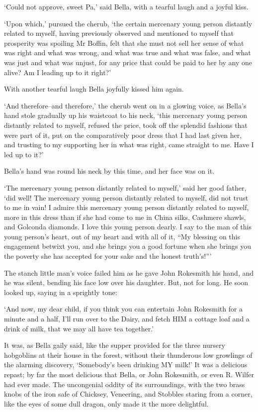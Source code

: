‘Could not approve, sweet Pa,’ said Bella, with a tearful laugh and a
joyful kiss.

‘Upon which,’ pursued the cherub, ‘the certain mercenary young person
distantly related to myself, having previously observed and mentioned
to myself that prosperity was spoiling Mr Boffin, felt that she must not
sell her sense of what was right and what was wrong, and what was true
and what was false, and what was just and what was unjust, for any
price that could be paid to her by any one alive? Am I leading up to it
right?’

With another tearful laugh Bella joyfully kissed him again.

‘And therefore--and therefore,’ the cherub went on in a glowing voice,
as Bella’s hand stole gradually up his waistcoat to his neck, ‘this
mercenary young person distantly related to myself, refused the
price, took off the splendid fashions that were part of it, put on the
comparatively poor dress that I had last given her, and trusting to my
supporting her in what was right, came straight to me. Have I led up to
it?’

Bella’s hand was round his neck by this time, and her face was on it.

‘The mercenary young person distantly related to myself,’ said her
good father, ‘did well! The mercenary young person distantly related
to myself, did not trust to me in vain! I admire this mercenary young
person distantly related to myself, more in this dress than if she had
come to me in China silks, Cashmere shawls, and Golconda diamonds. I
love this young person dearly. I say to the man of this young person’s
heart, out of my heart and with all of it, “My blessing on this
engagement betwixt you, and she brings you a good fortune when she
brings you the poverty she has accepted for your sake and the honest
truth’s!”’

The stanch little man’s voice failed him as he gave John Rokesmith his
hand, and he was silent, bending his face low over his daughter. But,
not for long. He soon looked up, saying in a sprightly tone:

‘And now, my dear child, if you think you can entertain John Rokesmith
for a minute and a half, I’ll run over to the Dairy, and fetch HIM a
cottage loaf and a drink of milk, that we may all have tea together.’

It was, as Bella gaily said, like the supper provided for the three
nursery hobgoblins at their house in the forest, without their
thunderous low growlings of the alarming discovery, ‘Somebody’s been
drinking MY milk!’ It was a delicious repast; by far the most delicious
that Bella, or John Rokesmith, or even R. Wilfer had ever made. The
uncongenial oddity of its surroundings, with the two brass knobs of the
iron safe of Chicksey, Veneering, and Stobbles staring from a corner,
like the eyes of some dull dragon, only made it the more delightful.


